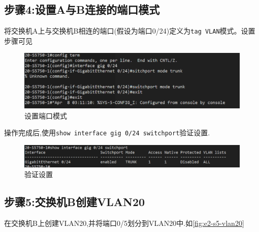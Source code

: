 \documentclass{myreport}
\begin{document}
\subsection{步骤4:设置A与B连接的端口模式}

将交换机A上与交换机B相连的端口(假设为端口0/24)定义为\texttt{tag VLAN}模式。设置步骤可见

\begin{figure}[htp]
    \centering
    \includegraphics[width=13cm]{"./figure/2018-05-17-17-05-54.png
    "}
    \caption{设置端口模式}
    \label{fig:e2-s4-trunk}
\end{figure}



操作完成后,使用\texttt{show interface gig 0/24 switchport}验证设置.
\begin{figure}[htp]
    \centering
    \includegraphics[width=13cm]{"./figure/2018-05-17-17-06-02.png"}
    \caption{验证设置}
    \label{fig:e2-s4-see-port}
\end{figure}



\subsection{步骤5:交换机B创建VLAN20}

在交换机B上创建VLAN20,并将端口0/5划分到VLAN20中.如\autoref{fig:e2-s5-vlan20}
\end{document}
